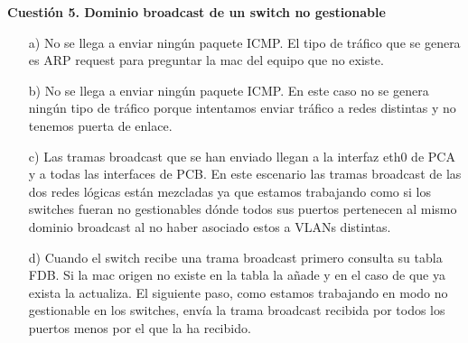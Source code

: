 \documentclass[a4paper,12pt,twoside]{article}
\begin{document}
{\bf Cuestión 5. Dominio broadcast de un switch no gestionable}
\begin{itemize}
\item[a)]No se llega a enviar ningún paquete ICMP. El tipo de tráfico que se genera es ARP request para preguntar la mac del equipo que no existe.
\item[b)] No se llega a enviar ningún paquete ICMP. En este caso no se genera ningún tipo de tráfico porque intentamos enviar tráfico a redes distintas y no tenemos puerta de enlace.
\item[c)]Las tramas broadcast que se han enviado llegan a la interfaz eth0 de PCA y a todas las interfaces de PCB. En este escenario las tramas broadcast de las dos redes lógicas están mezcladas ya que estamos trabajando como si los switches fueran no gestionables dónde todos sus puertos pertenecen al mismo dominio broadcast al no haber asociado estos a VLANs distintas.
\item[d)]Cuando el switch recibe una trama broadcast primero consulta su tabla FDB. Si la mac origen no existe en la tabla la añade y en el caso de que ya exista la actualiza. El siguiente paso, como estamos trabajando en modo no gestionable en los switches, envía la trama broadcast recibida por todos los puertos menos por el que la ha recibido. 
\end{itemize}
\end{document}
